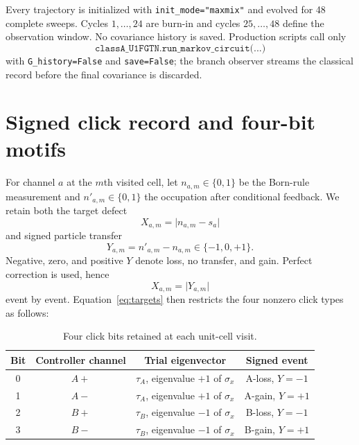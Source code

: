 \documentclass[aps,prb,onecolumn,nofootinbib,superscriptaddress]{revtex4-2}
\begin{document}
Every trajectory is initialized with \texttt{init\_mode="maxmix"} and evolved
for 48 complete sweeps.  Cycles \(1,\ldots,24\) are burn-in and cycles
\(25,\ldots,48\) define the observation window.  No covariance history is
saved.  Production scripts call only
\begin{equation}
 \texttt{classA\_U1FGTN.run\_markov\_circuit(...)}
\end{equation}
with \texttt{G\_history=False} and \texttt{save=False}; the branch observer
streams the classical record before the final covariance is discarded.

\section{Signed click record and four-bit motifs}

For channel \(a\) at the \(m\)th visited cell, let
\(n_{a,m}\in\{0,1\}\) be the Born-rule measurement and
\(n'_{a,m}\in\{0,1\}\) the occupation after conditional feedback.  We retain
both the target defect
\begin{equation}
 X_{a,m}=\lvert n_{a,m}-s_a\rvert
\end{equation}
and signed particle transfer
\begin{equation}
 Y_{a,m}=n'_{a,m}-n_{a,m}\in\{-1,0,+1\}.
 \label{eq:signed-transfer}
\end{equation}
Negative, zero, and positive \(Y\) denote loss, no transfer, and gain.  Perfect
correction is used, hence
\begin{equation}
 X_{a,m}=\lvert Y_{a,m}\rvert
 \label{eq:perfect-identity}
\end{equation}
event by event.  Equation~\eqref{eq:targets} then restricts the four nonzero
click types as follows:
\begin{table}[ht]
\caption{Four click bits retained at each unit-cell visit.}
\begin{ruledtabular}
\begin{tabular}{cccc}
Bit & Controller channel & Trial eigenvector & Signed event \\
\midrule
0 & \(A+\) & \(\tau_A\), eigenvalue \(+1\) of \(\sigma_x\) & A-loss, \(Y=-1\) \\
1 & \(A-\) & \(\tau_A\), eigenvalue \(+1\) of \(\sigma_x\) & A-gain, \(Y=+1\) \\
2 & \(B+\) & \(\tau_B\), eigenvalue \(-1\) of \(\sigma_x\) & B-loss, \(Y=-1\) \\
3 & \(B-\) & \(\tau_B\), eigenvalue \(-1\) of \(\sigma_x\) & B-gain, \(Y=+1\) \\
\end{tabular}
\end{ruledtabular}
\end{table}
\end{document}
